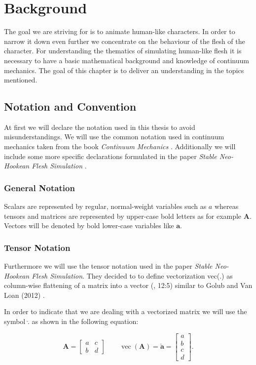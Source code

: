 \chapter{Background} \label{c:Background}
The goal we are striving for is to animate human-like characters. In order to narrow it down even further we concentrate on the behaviour of the flesh of the character. 
For understanding the thematics of simulating human-like flesh it is necessary to have a basic mathematical background and knowledge of continuum mechanics. The goal of this chapter is to deliver an understanding in the topics mentioned.


\section{Notation and Convention}
At first we will declare the notation used in this thesis to avoid misunderstandings. We will use the common notation used in continuum mechanics taken from the book \textit{Continuum Mechanics} \cite{Spencer1980}. Additionally we will include some more specific declarations formulated in the paper \textit{Stable Neo-Hookean Flesh Simulation} \cite{Smith:2018:SNF:3191713.3180491}. 


\subsection{General Notation}
Scalars are represented by regular, normal-weight variables such as $a$ whereas 
tensors and matrices are represented by upper-case bold letters as for example $\textbf{A}$. Vectors will be denoted by bold lower-case variables like $\textbf{a}$. 


\subsection{Tensor Notation}
Furthermore we will use the tensor notation used in the paper \textit{Stable Neo-Hookean Flesh Simulation}. They decided to to define vectorization vec(.) as column-wise flattening of a matrix into a vector (\cite{Smith:2018:SNF:3191713.3180491}, 12:5) similar to Golub and Van Loan (2012) \cite{golub2012matrix}.

In order to indicate that we are dealing with a vectorized matrix we will use the symbol $\check{.}$ as shown in the following equation:

\[
\textbf{A} = \begin{bmatrix} a & c \\ b & d \end{bmatrix} \qquad \operatorname{vec}(\textbf{A}) = \boldsymbol{\check{a}} = \begin{bmatrix} a \\ b \\ c \\ d \end{bmatrix}.
\]

